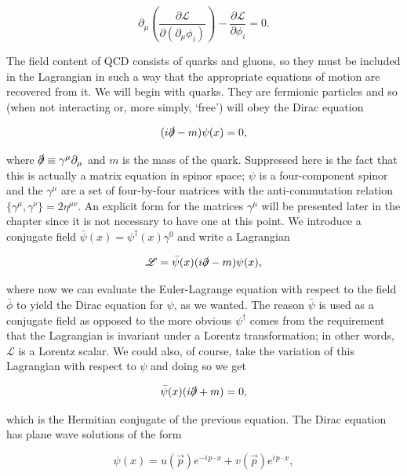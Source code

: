 \begin{equation}
\label{eqn:el}
\partial_\mu \left( \frac{\partial \mathscr{L}}{\partial (\partial_\mu \phi_i)} \right) - \frac{\partial \mathscr{L}}{\partial \phi_i} = 0.
\end{equation}

The field content of QCD consists of quarks and gluons, so they must be included in the Lagrangian in such a way that the appropriate equations of motion are recovered from it. We will begin with quarks. They are fermionic particles and so (when not interacting or, more simply, `free') will obey the Dirac equation

\begin{equation}
(i \slashed{\partial} - m) \psi(x) = 0,
\end{equation}

where $\slashed{\partial} \equiv \gamma^\mu \partial_\mu$ and $m$ is the mass of the quark. Suppressed here is the fact that this is actually a matrix equation in spinor space; $\psi$ is a four-component spinor and the $\gamma^\mu$ are a set of four-by-four matrices with the anti-commutation relation $\{\gamma^\mu, \gamma^\nu\} = 2 \eta^{\mu \nu}$. An explicit form for the matrices $\gamma^\mu$ will be presented later in the chapter since it is not necessary to have one at this point. We introduce a conjugate field $\bar{\psi}(x) = \psi^\dagger(x) \gamma^0$ and write a Lagrangian

\begin{equation}
\mathscr{L} = \bar{\psi}(x)(i \slashed{\partial} - m) \psi(x),
\end{equation}

where now we can evaluate the Euler-Lagrange equation with respect to the field $\bar{\phi}$ to yield the Dirac equation for $\psi$, as we wanted. The reason $\bar{\psi}$ is used as a conjugate field as opposed to the more obvious $\psi^\dagger$ comes from the requirement that the Lagrangian is invariant under a Lorentz transformation; in other words, $\mathscr{L}$ is a Lorentz scalar. We could also, of course, take the variation of this Lagrangian with respect to $\psi$ and doing so we get

\begin{equation}
\bar{\psi}(x)(i \slashed{\partial} + m) = 0,
\end{equation}

which is the Hermitian conjugate of the previous equation. The Dirac equation has plane wave solutions of the form

\begin{equation}
\label{eqn:dirac}
\psi(x) = u\left(\vec{p}\right )e^{- i \hspace{1pt}p \cdot x} + v\left(\vec{p}\right ) e^{i \hspace{1pt} p \cdot x},
\end{equation}


